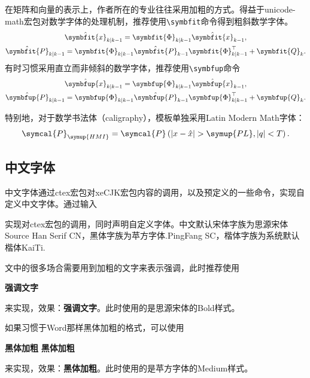 \documentclass{gunote}
\newcommand{\cmd}[1]{\texttt{\backslash #1}}
\def\mbi{\symbfit}
\def\mbu{\symbfup}
\begin{document}
在矩阵和向量的表示上，作者所在的专业往往采用加粗的方式。得益于\textsf{unicode-math}宏包对数学字体的处理机制，推荐使用\cmd{symbfit}命令得到粗斜数学字体。
\begin{gather}
  \hat{\mbi{x}}_{k\mid k-1}=\mbi{\Phi}_{k\mid k-1}\hat{\mbi{x}}_{k-1},\\
  \hat{\mbi{P}}_{k\mid k-1}=\mbi{\Phi}_{k\mid k-1}\hat{\mbi{P}}_{k-1}\mbi{\Phi}_{k\mid k-1}^\top+\mbi{Q}_k.
\end{gather}
有时习惯采用直立而非倾斜的数学字体，推荐使用\cmd{symbfup}命令
\begin{gather}
  \hat{\mbu{x}}_{k\mid k-1}=\mbu{\Phi}_{k\mid k-1}\hat{\mbu{x}}_{k-1},\\
  \hat{\mbu{P}}_{k\mid k-1}=\mbu{\Phi}_{k\mid k-1}\hat{\mbu{P}}_{k-1}\mbu{\Phi}_{k\mid k-1}^\top+\mbu{Q}_k.
\end{gather}

特别地，对于数学书法体（caligraphy），模板单独采用Latin Modern Math字体：
\begin{equation}
  \symcal{P}_{\symup{HMI}}=\symcal{P}\left(\vert x-\hat{x}\vert>\symup{PL},\vert q\vert<T\right).
\end{equation}
\subsection{中文字体}
中文字体通过\textsf{ctex}宏包对\textsf{xeCJK}宏包内容的调用，以及预定义的一些命令，实现自定义中文字体。通过输入
\begin{Code*}[latex]
\end{Code*}
实现对\textsf{ctex}宏包的调用，同时声明自定义字体。中文默认宋体字族为思源宋体Source Han Serif CN，黑体字族为苹方字体.PingFang SC，楷体字族为系统默认楷体KaiTi.

文中的很多场合需要用到加粗的文字来表示强调，此时推荐使用
\begin{Code*}[latex]
\textbf{强调文字}
\end{Code*}
来实现，效果：\textbf{强调文字}。此时使用的是思源宋体的Bold样式。

如果习惯于Word那样黑体加粗的格式，可以使用
\begin{Code*}[latex]
{\bfseries\sffamily 黑体加粗}
\textbf{\heiti 黑体加粗}
\end{Code*}
来实现，效果：{\bfseries\sffamily 黑体加粗}。此时使用的是苹方字体的Medium样式。
\end{document}
